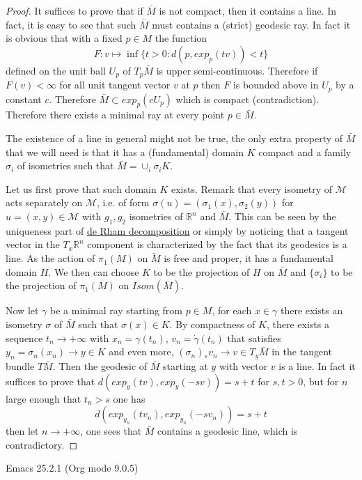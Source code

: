 \documentclass[11pt]{article}
\begin{document}
\begin{proof}
It suffices to prove that if \(\bar M\) is not compact, then it contains a line. In fact, it is easy
to see that such \(\bar M\) must contains a (strict) geodesic ray. In fact it is obvious that with a fixed \(p\in
M\) the function
\[
F: v\mapsto \inf \{t>0: d(p,exp_p(tv)) < t\}
\]
defined on the unit ball \(U_p\) of \(T_p\bar M\) is upper semi-continuous. Therefore if \(F(v)<\infty\)
for all unit tangent vector \(v\) at \(p\) then \(F\) is bounded above in \(U_p\) by a constant \(c\). Therefore
\(\bar M\subset exp_p(cU_p)\) which is compact (contradiction). Therefore there exists a minimal ray
at every point \(p\in \bar M\).

The existence of a line in general might not be true, the only extra property of \(\bar M\) that we
will need is that it has a (fundamental) domain \(K\) compact and a family \(\sigma_i\) of isometries
such that \(\bar M = \cup_i \sigma_i K\).

Let us first prove that such domain \(K\) exists. Remark that every isometry of \(\mathcal{M}\) acts
separately on \(\mathcal{M}\), i.e. of form \(\sigma(u) = (\sigma_1(x), \sigma_2(y))\) for \(u=(x,y)\in
\mathcal{M}\) with \(g_1, g_2\) isometries of \(\mathbb{R}^n\) and \(\bar M\). This can be seen by the
uniqueness part of \href{de-rham-decomposition.org}{de Rham decomposition} or simply by noticing that a tangent vector in the
\(T_x\mathbb{R}^n\) component is characterized by the fact that its geodesics is a line. As the action
of \(\pi_1(M)\) on \(\tilde M\) is free and proper, it has a fundamental domain \(H\). We then can choose
\(K\) to be the projection of \(H\) on \(\bar M\) and \(\{\sigma_i\}\) to be the projection of \(\pi_1(M)\) on
\(Isom(\bar M)\). 

Now let \(\gamma\) be a minimal ray starting from \(p\in M\), for each \(x\in \gamma\) there exists an
isometry \(\sigma\) of \(\bar M\) such that \(\sigma(x)\in K\). By compactness of \(K\), there exists a
sequence \(t_n \to +\infty\) with \(x_n =\gamma(t_n)\), \(v_n = \dot\gamma(t_n)\) that satisfies \(y_n =
\sigma_n(x_n) \to y\in K\) and even more, \((\sigma_n)_* v_n \to v\in T_y\bar M\) in the tangent bundle \(T\bar
M\). Then the geodesic of \(\bar M\) starting at \(y\) with vector \(v\) is a
line. In fact it suffices to prove that \(d(exp_y(t v), exp_y(-s v)) = s+t\) for \(s,t>0\), but for \(n\)
large enough that \(t_n > s\) one has
\[
d(exp_{y_n}(tv_n), exp_{y_n}(-sv_n)) = s+t
\]
then let \(n\to +\infty\), one sees that \(\bar M\) contains a geodesic line, which is contradictory.
\end{proof}
Emacs 25.2.1 (Org mode 9.0.5)
\end{document}
